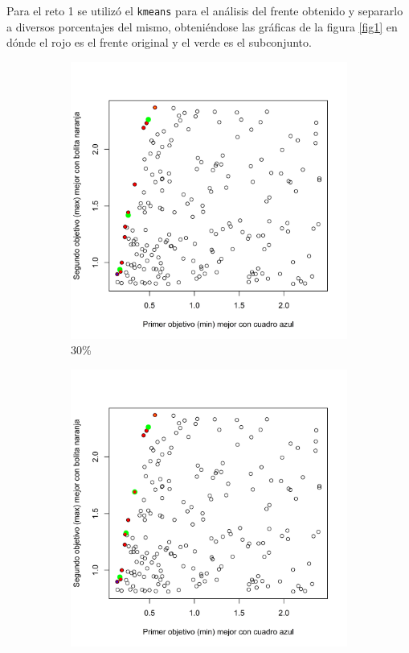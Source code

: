 \documentclass{article}
\begin{document}
Para el reto 1 se utilizó el \texttt{kmeans} \cite{kmean} para el análisis del frente obtenido y separarlo a diversos porcentajes del mismo, obteniéndose las gráficas de la figura \ref{fig1} en dónde el rojo es el frente original y el verde es el subconjunto. 

\newpage

\begin{figure}[h!]
\centering
\caption{Frente a diversos porcentajes.}
\begin{subfigure}[b]{0.45\linewidth}
\includegraphics[width=\linewidth]{r130.png}
\caption{30\%}
\label{r130}
\end{subfigure}
\begin{subfigure}[b]{0.45\linewidth}
\includegraphics[width=\linewidth]{r140.png}

\end{subfigure}
\end{figure}
\end{document}
